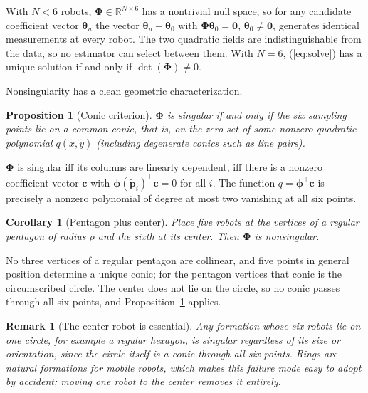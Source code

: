 \documentclass[lettersize,journal]{IEEEtran}
\newtheorem{proposition}{Proposition}
\newtheorem{corollary}{Corollary}
\newtheorem{remark}{Remark}
\begin{document}
\begin{IEEEproof}
With $N < 6$ robots, $\boldsymbol{\Phi} \in \mathbb{R}^{N \times 6}$ has
a nontrivial null space, so for any candidate coefficient vector
$\boldsymbol{\theta}_u$ the vector $\boldsymbol{\theta}_u +
\boldsymbol{\theta}_0$ with $\boldsymbol{\Phi}\boldsymbol{\theta}_0 =
\mathbf{0}$, $\boldsymbol{\theta}_0 \neq \mathbf{0}$, generates identical
measurements at every robot. The two quadratic fields are
indistinguishable from the data, so no estimator can select between
them. With $N = 6$, (\ref{eq:solve}) has a unique solution if and only if
$\det(\boldsymbol{\Phi}) \neq 0$.
\end{IEEEproof}

Nonsingularity has a clean geometric characterization.

\begin{proposition}[Conic criterion]
\label{prop:conic}
$\boldsymbol{\Phi}$ is singular if and only if the six sampling points
lie on a common conic, that is, on the zero set of some nonzero quadratic
polynomial $q(\tilde{x}, \tilde{y})$ (including degenerate conics such as
line pairs).
\end{proposition}

\begin{IEEEproof}
$\boldsymbol{\Phi}$ is singular iff its columns are linearly dependent,
iff there is a nonzero coefficient vector $\mathbf{c}$ with
$\boldsymbol{\phi}(\tilde{\mathbf{p}}_i)^\top \mathbf{c} = 0$ for all
$i$. The function $q = \boldsymbol{\phi}^\top \mathbf{c}$ is precisely a
nonzero polynomial of degree at most two vanishing at all six points.
\end{IEEEproof}

\begin{corollary}[Pentagon plus center]
\label{cor:pentagon}
Place five robots at the vertices of a regular pentagon of radius $\rho$
and the sixth at its center. Then $\boldsymbol{\Phi}$ is nonsingular.
\end{corollary}

\begin{IEEEproof}
No three vertices of a regular pentagon are collinear, and five points in
general position determine a unique conic; for the pentagon vertices that
conic is the circumscribed circle. The center does not lie on the
circle, so no conic passes through all six points, and
Proposition~\ref{prop:conic} applies.
\end{IEEEproof}

\begin{remark}[The center robot is essential]
Any formation whose six robots lie on one circle, for example a regular
hexagon, is singular regardless of its size or orientation, since the
circle itself is a conic through all six points. Rings are natural
formations for mobile robots, which makes this failure mode easy to adopt
by accident; moving one robot to the center removes it entirely.
\end{remark}
\end{document}
